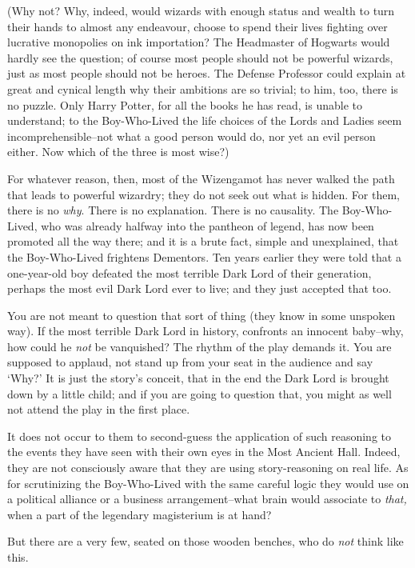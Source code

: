 (Why not? Why, indeed, would wizards with enough status and wealth to turn their hands to almost any endeavour, choose to spend their lives fighting over lucrative monopolies on ink importation? The Headmaster of Hogwarts would hardly see the question; of course most people should not be powerful wizards, just as most people should not be heroes. The Defense Professor could explain at great and cynical length why their ambitions are so trivial; to him, too, there is no puzzle. Only Harry Potter, for all the books he has read, is unable to understand; to the Boy-Who-Lived the life choices of the Lords and Ladies seem incomprehensible\---not what a good person would do, nor yet an evil person either. Now which of the three is most wise?)

For whatever reason, then, most of the Wizengamot has never walked the path that leads to powerful wizardry; they do not seek out what is hidden. For them, there is no \emph{why}. There is no explanation. There is no causality. The Boy-Who-Lived, who was already halfway into the pantheon of legend, has now been promoted all the way there; and it is a brute fact, simple and unexplained, that the Boy-Who-Lived frightens Dementors. Ten years earlier they were told that a one-year-old boy defeated the most terrible Dark Lord of their generation, perhaps the most evil Dark Lord ever to live; and they just accepted that too.

You are not meant to question that sort of thing (they know in some unspoken way). If the most terrible Dark Lord in history, confronts an innocent baby\---why, how could he \emph{not} be vanquished? The rhythm of the play demands it. You are supposed to applaud, not stand up from your seat in the audience and say `Why?' It is just the story's conceit, that in the end the Dark Lord is brought down by a little child; and if you are going to question that, you might as well not attend the play in the first place.

It does not occur to them to second-guess the application of such reasoning to the events they have seen with their own eyes in the Most Ancient Hall. Indeed, they are not consciously aware that they are using story-reasoning on real life. As for scrutinizing the Boy-Who-Lived with the same careful logic they would use on a political alliance or a business arrangement\---what brain would associate to \emph{that,} when a part of the legendary magisterium is at hand?

But there are a very few, seated on those wooden benches, who do \emph{not} think like this.


